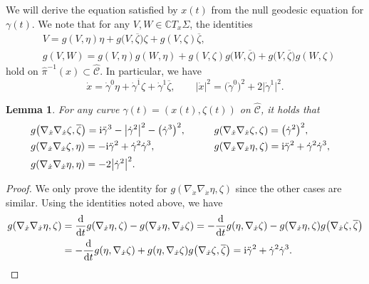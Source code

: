 \documentclass[pdftex]{sigma}
\newcommand\ol{\overline}
\newcommand{\wh}{\widehat}
\numberwithin{equation}{section}
\newtheorem{Lemma}[Theorem]{Lemma}
\begin{document}
We will derive the equation satisfied by $x(t)$ from the null geodesic equation for $\gamma(t)$. We note that for any $V, W\in \mathbb{C}T_x\Sigma$, the identities
\begin{align*}
&V=g(V, \eta)\eta+g\bigl(V, \ol\zeta\bigr)\zeta+g(V, \zeta)\ol\zeta, \\
&g(V, W)=g(V, \eta)g(W, \eta)+g(V, \zeta)g\bigl(W, \ol\zeta\bigr)+g\bigl(V, \ol\zeta\bigr)g(W, \zeta)
\end{align*}
hold on $\hat\pi^{-1}(x)\subset\wh{\mathcal{C}}$. In particular, we have
\begin{equation}\label{x-zeta-eta}
\dot x=\dot\gamma^0\eta+\dot\gamma^{\ol1}\zeta+\dot\gamma^1\ol\zeta, \qquad |\dot x|^2=\bigl(\dot\gamma^0\bigr)^2+2\bigl|\dot\gamma^1\bigr|^2.
\end{equation}
\begin{Lemma}
For any curve $\gamma(t)=(x(t), \zeta(t))$ on $\wh{\mathcal{C}}$, it holds that
\begin{alignat}{3}
&g\bigl(\nabla_{\dot x}\nabla_{\dot x}\zeta, \ol\zeta\bigr) ={\rm i}\ddot\gamma^3-\bigl|\dot\gamma^2\bigr|^2-\bigl(\dot\gamma^3\bigr)^2, \qquad&&
g(\nabla_{\dot x}\nabla_{\dot x}\zeta, \zeta) =\bigl(\dot\gamma^2\bigr)^2,& \nonumber \\
&g(\nabla_{\dot x}\nabla_{\dot x}\zeta, \eta) =-{\rm i}\ddot\gamma^2+\dot\gamma^2\dot\gamma^3, \qquad&&
g(\nabla_{\dot x}\nabla_{\dot x}\eta, \zeta) ={\rm i}\ddot\gamma^2+\dot\gamma^2\dot\gamma^3, &\nonumber \\
&g(\nabla_{\dot x}\nabla_{\dot x}\eta, \eta) =-2\bigl|\dot\gamma^2\bigr|^2.&\label{nabla-zeta-eta}
\end{alignat}
\end{Lemma}
\begin{proof}
We only prove the identity for $g(\nabla_{\dot x}\nabla_{\dot x}\eta, \zeta)$ since the other cases are similar. Using the identities noted above, we have
\begin{align*}
g(\nabla_{\dot x}\nabla_{\dot x}\eta, \zeta)
&=\frac{{\rm d}}{{\rm d}t}g(\nabla_{\dot x}\eta, \zeta)-g(\nabla_{\dot x}\eta, \nabla_{\dot x}\zeta) =-\frac{{\rm d}}{{\rm d}t}g(\eta, \nabla_{\dot x}\zeta)-g(\nabla_{\dot x}\eta, \zeta)g\bigl(\nabla_{\dot x}\zeta, \ol\zeta\bigr) \\
&=-\frac{{\rm d}}{{\rm d}t}g(\eta, \nabla_{\dot x}\zeta)+g(\eta, \nabla_{\dot x}\zeta)g\bigl(\nabla_{\dot x}\zeta, \ol\zeta\bigr)
={\rm i}\ddot\gamma^2+\dot\gamma^2\dot\gamma^3.
\tag*{\qed}
\end{align*}
\renewcommand{\qed}{}
\end{proof}
\end{document}
